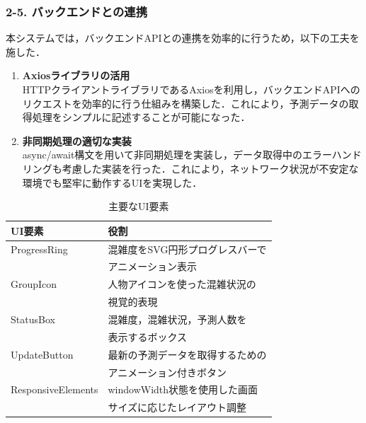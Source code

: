 \subsubsection*{2-5. バックエンドとの連携}
本システムでは，バックエンドAPIとの連携を効率的に行うため，以下の工夫を施した．

\begin{enumerate}
	\item {\bfseries Axiosライブラリの活用}\\
	HTTPクライアントライブラリであるAxiosを利用し，バックエンドAPIへのリクエストを効率的に行う仕組みを構築した．これにより，予測データの取得処理をシンプルに記述することが可能になった．
	
	\item {\bfseries 非同期処理の適切な実装}\\
	async/await構文を用いて非同期処理を実装し，データ取得中のエラーハンドリングも考慮した実装を行った．これにより，ネットワーク状況が不安定な環境でも堅牢に動作するUIを実現した．
\end{enumerate}

\begin{table}[tb]
	\centering
	\caption{主要なUI要素}
	\label{tbl:UI_components}
	\small
	\setlength{\tabcolsep}{4pt}
	\doublerulesep=0.3pt
	\begin{tabular}{l|p{5cm}} \hline\hline\hline
		UI要素 & 役割 \\ \hline
		ProgressRing & 混雑度をSVG円形プログレスバーで\\
		&アニメーション表示 \\ \hline
		GroupIcon & 人物アイコンを使った混雑状況の\\
		&視覚的表現 \\ \hline
		StatusBox & 混雑度，混雑状況，予測人数を\\
		&表示するボックス \\ \hline
		UpdateButton & 最新の予測データを取得するための\\
		&アニメーション付きボタン \\ \hline
		ResponsiveElements & windowWidth状態を使用した画面\\
		&サイズに応じたレイアウト調整 \\ \hline\hline\hline
	\end{tabular}
\end{table}

